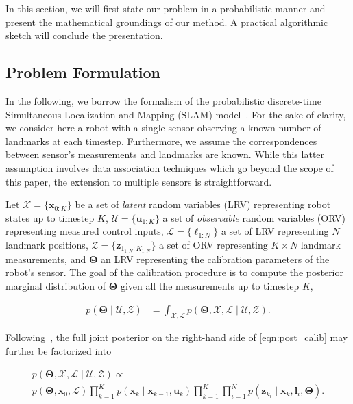 In this section, we will first state our problem in a probabilistic manner and
present the mathematical groundings of our method. A practical algorithmic
sketch will conclude the presentation.\cite{huat06industrial}\cite{gibbs11advanced}

\subsection{Problem Formulation\label{subsec:prob}}

In the following, we borrow the formalism of the probabilistic discrete-time
Simultaneous Localization and Mapping (SLAM)
model~\cite{durrantwhyte06simultaneous}. For the sake of clarity, we
consider here a robot with a single sensor observing a known number of landmarks
at each timestep. Furthermore, we assume the correspondences between sensor's
measurements and landmarks are known. While this latter assumption involves data
association techniques which go beyond the scope of this paper, the extension to
multiple sensors is straightforward.

Let
$\mathcal{X}=\{\mathbf{x}_{0:K}\}$ be a set of \emph{latent} random variables
(LRV) representing robot states up to timestep $K$,
$\mathcal{U}=\{\mathbf{u}_{1:K}\}$ a set of \emph{observable} random variables
(ORV) representing measured control inputs,
$\mathcal{L}=\{\boldsymbol{\ell}_{1:N}\}$ a set of LRV representing $N$
landmark positions, $\mathcal{Z}=\{\mathbf{z}_{1_{1:N}:K_{1:N}}\}$ a set of ORV
representing $K \times N$ landmark measurements, and $\boldsymbol{\Theta}$ an
LRV representing the calibration parameters of the robot's sensor. The goal of
the calibration procedure is to compute the posterior marginal distribution of
$\boldsymbol{\Theta}$ given all the measurements up to timestep $K$,

\begin{equation}\label{eqn:post_calib}
  \begin{aligned}
  p(\boldsymbol{\Theta}\mid\mathcal{U},\mathcal{Z}) &=
    \int_{\mathcal{X}, \mathcal{L}}p(\boldsymbol{\Theta}, \mathcal{X},
    \mathcal{L} \mid\mathcal{U},\mathcal{Z}).
  \end{aligned}
\end{equation}

\noindent Following~\cite{durrantwhyte06simultaneous}, the full joint posterior
on the right-hand side of \eqref{eqn:post_calib} may further be factorized into

\begin{multline}\label{eqn:post_joint_factorized}
  p(\boldsymbol{\Theta}, \mathcal{X},
    \mathcal{L} \mid\mathcal{U},\mathcal{Z}) \propto\\
    p(\boldsymbol{\Theta}, \mathbf{x}_0,\mathcal{L})
    \prod_{k=1}^K p(\mathbf{x}_k\mid\mathbf{x}_{k - 1},\mathbf{u}_k)
    \prod_{k=1}^K\prod_{i=1}^N p(\mathbf{z}_{k_i}\mid\mathbf{x}_k,
    \mathbf{l}_i,\boldsymbol{\Theta}).
\end{multline}

